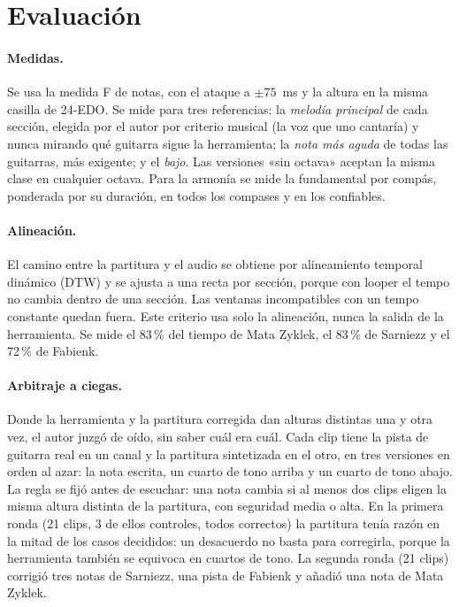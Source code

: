 \section{Evaluación}\label{sec:evaluacion}

\paragraph{Medidas.} Se usa la medida F de notas, con el ataque a $\pm75$~ms y la altura en la misma casilla de 24-EDO.
Se mide para tres referencias: la \emph{melodía principal} de cada sección, elegida por el autor por criterio musical
(la voz que uno cantaría) y nunca mirando qué guitarra sigue la herramienta; la \emph{nota más aguda} de todas las
guitarras, más exigente; y el \emph{bajo}. Las versiones «sin octava» aceptan la misma clase en cualquier octava. Para la
armonía se mide la fundamental por compás, ponderada por su duración, en todos los compases y en los confiables.

\paragraph{Alineación.} El camino entre la partitura y el audio se obtiene por alineamiento temporal dinámico (DTW) y se
ajusta a una recta por sección, porque con looper el tempo no cambia dentro de una sección. Las ventanas incompatibles con
un tempo constante quedan fuera. Este criterio usa solo la alineación, nunca la salida de la herramienta. Se mide el 83\,\%
del tiempo de Mata Zyklek, el 83\,\% de Sarniezz y el 72\,\% de Fabienk.

\paragraph{Arbitraje a ciegas.} Donde la herramienta y la partitura corregida dan alturas distintas una y otra vez, el
autor juzgó de oído, sin saber cuál era cuál. Cada clip tiene la pista de guitarra real en un canal y la partitura
sintetizada en el otro, en tres versiones en orden al azar: la nota escrita, un cuarto de tono arriba y un cuarto de tono
abajo. La regla se fijó antes de escuchar: una nota cambia si al menos dos clips eligen la misma altura distinta de la
partitura, con seguridad media o alta. En la primera ronda (21 clips, 3 de ellos controles, todos correctos) la partitura
tenía razón en la mitad de los casos decididos: un desacuerdo no basta para corregirla, porque la herramienta también se
equivoca en cuartos de tono. La segunda ronda (21 clips) corrigió tres notas de Sarniezz, una pista de Fabienk y añadió
una nota de Mata Zyklek.

